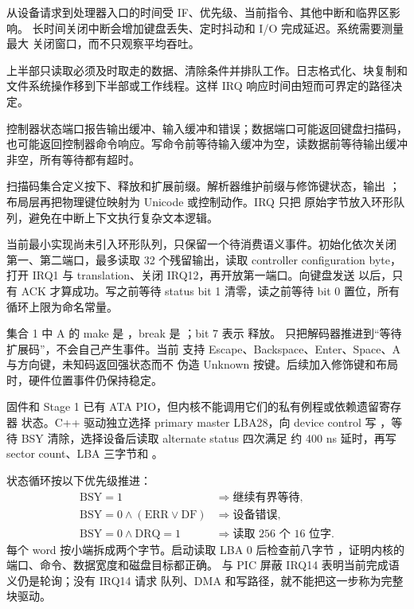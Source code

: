 从设备请求到处理器入口的时间受 IF、优先级、当前指令、其他中断和临界区影响。
长时间关闭中断会增加键盘丢失、定时抖动和 I/O 完成延迟。系统需要测量最大
关闭窗口，而不只观察平均吞吐。

上半部只读取必须及时取走的数据、清除条件并排队工作。日志格式化、块复制和
文件系统操作移到下半部或工作线程。这样 IRQ 响应时间由短而可界定的路径决定。

控制器状态端口报告输出缓冲、输入缓冲和错误；数据端口可能返回键盘扫描码，
也可能返回控制器命令响应。写命令前等待输入缓冲为空，读数据前等待输出缓冲
非空，所有等待都有超时。

扫描码集合定义按下、释放和扩展前缀。解析器维护前缀与修饰键状态，输出
；布局层再把物理键位映射为 Unicode 或控制动作。IRQ 只把
原始字节放入环形队列，避免在中断上下文执行复杂文本逻辑。

当前最小实现尚未引入环形队列，只保留一个待消费语义事件。初始化依次关闭
第一、第二端口，最多读取 32 个残留输出，读取 controller configuration
byte，打开 IRQ1 与 translation、关闭 IRQ12，再开放第一端口。向键盘发送
 以后，只有  ACK 才算成功。写之前等待 status
bit 1 清零，读之前等待 bit 0 置位，所有循环上限为命名常量。

集合 1 中 A 的 make 是 ，break 是 ；bit 7 表示
释放。 只把解码器推进到“等待扩展码”，不会自己产生事件。当前
支持 Escape、Backspace、Enter、Space、A 与方向键，未知码返回强状态而不
伪造 Unknown 按键。后续加入修饰键和布局时，硬件位置事件仍保持稳定。

固件和 Stage 1 已有 ATA PIO，但内核不能调用它们的私有例程或依赖遗留寄存器
状态。C++ 驱动独立选择 primary master LBA28，向 device control
写 ，等待 BSY 清除，选择设备后读取 alternate status 四次满足
约 400 ns 延时，再写 sector count、LBA 三字节和 。

状态循环按以下优先级推进：
\[
\begin{aligned}
\mathrm{BSY}=1 &\Rightarrow \text{继续有界等待},\\
\mathrm{BSY}=0\land(\mathrm{ERR}\lor\mathrm{DF}) &\Rightarrow \text{设备错误},\\
\mathrm{BSY}=0\land\mathrm{DRQ}=1 &\Rightarrow \text{读取 256 个 16 位字}.
\end{aligned}
\]
每个 word 按小端拆成两个字节。启动读取 LBA 0 后检查前八字节
，证明内核的端口、命令、数据宽度和磁盘目标都正确。
 与 PIC 屏蔽 IRQ14 表明当前完成语义仍是轮询；没有 IRQ14 请求
队列、DMA 和写路径，就不能把这一步称为完整块驱动。


